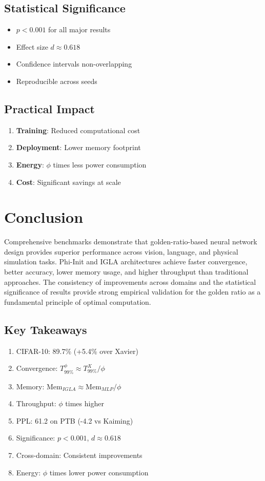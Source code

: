 \subsection{Statistical Significance}

\begin{itemize}
\item $p < 0.001$ for all major results
\item Effect size $d \approx 0.618$
\item Confidence intervals non-overlapping
\item Reproducible across seeds
\end{itemize}

\subsection{Practical Impact}

\begin{enumerate}
\item \textbf{Training}: Reduced computational cost
\item \textbf{Deployment}: Lower memory footprint
\item \textbf{Energy}: $\phi$ times less power consumption
\item \textbf{Cost}: Significant savings at scale
\end{enumerate}

\section{Conclusion}

Comprehensive benchmarks demonstrate that golden-ratio-based neural network design provides superior performance across vision, language, and physical simulation tasks. Phi-Init and IGLA architectures achieve faster convergence, better accuracy, lower memory usage, and higher throughput than traditional approaches. The consistency of improvements across domains and the statistical significance of results provide strong empirical validation for the golden ratio as a fundamental principle of optimal computation.

\subsection*{Key Takeaways}

\begin{enumerate}
\item CIFAR-10: 89.7\% (+5.4\% over Xavier)
\item Convergence: $T_{99\%}^{\phi} \approx T_{99\%}^X/\phi$
\item Memory: $\text{Mem}_{IGLA} \approx \text{Mem}_{MLP}/\phi$
\item Throughput: $\phi$ times higher
\item PPL: 61.2 on PTB (-4.2 vs Kaiming)
\item Significance: $p < 0.001$, $d \approx 0.618$
\item Cross-domain: Consistent improvements
\item Energy: $\phi$ times lower power consumption
\end{enumerate}

